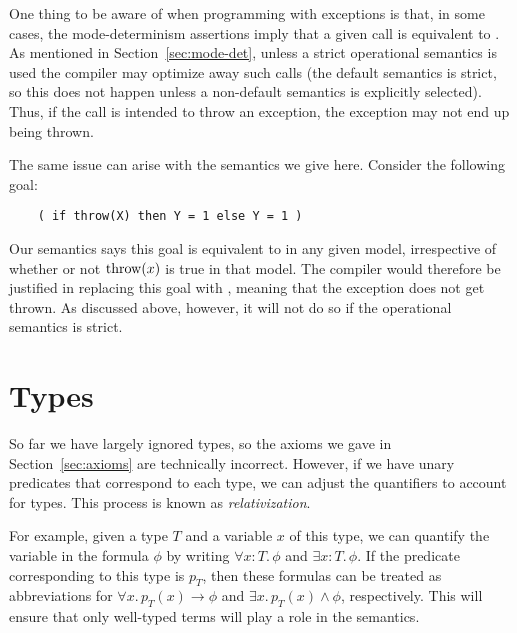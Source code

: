 One thing to be aware of when programming with exceptions
is that, in some cases,
the mode-determinism assertions imply
that a given call is equivalent to \true.
As mentioned in Section~\ref{sec:mode-det},
unless a strict operational semantics is used
the compiler may optimize away such calls
(the default semantics is strict,
so this does not happen unless
a non-default semantics is explicitly selected).
Thus, if the call is intended to throw an exception,
the exception may not end up being thrown.

The same issue can arise with the semantics we give here.
Consider the following goal:
\begin{verbatim}
    ( if throw(X) then Y = 1 else Y = 1 )
\end{verbatim}
Our semantics says this goal is equivalent to 
in any given model,
irrespective of whether or not $\operatorname{throw}(x)$
is true in that model.
The compiler would therefore be justified
in replacing this goal with ,
meaning that the exception does not get thrown.
As discussed above, however,
it will not do so if the operational semantics is strict.


\section{Types}
\label{sec:types}

So far we have largely ignored types,
so the axioms we gave in Section~\ref{sec:axioms}
are technically incorrect.
However,
if we have unary predicates that correspond to each type,
we can adjust the quantifiers to account for types.
This process is known as \emph{relativization\label{gi:relativization}}.

For example,
given a type $T$
and a variable $x$ of this type,
we can quantify the variable in the formula $\phi$
by writing $\forall x\!:\!T.\, \phi$ and $\exists x\!:\!T.\, \phi$.
If the predicate corresponding to this type is $p_T$,
then these formulas can be treated as abbreviations for
$\forall x.\, p_T(x) \rightarrow \phi$ and
$\exists x.\, p_T(x) \land \phi$,
respectively.
This will ensure that only well-typed terms
will play a role in the semantics.
